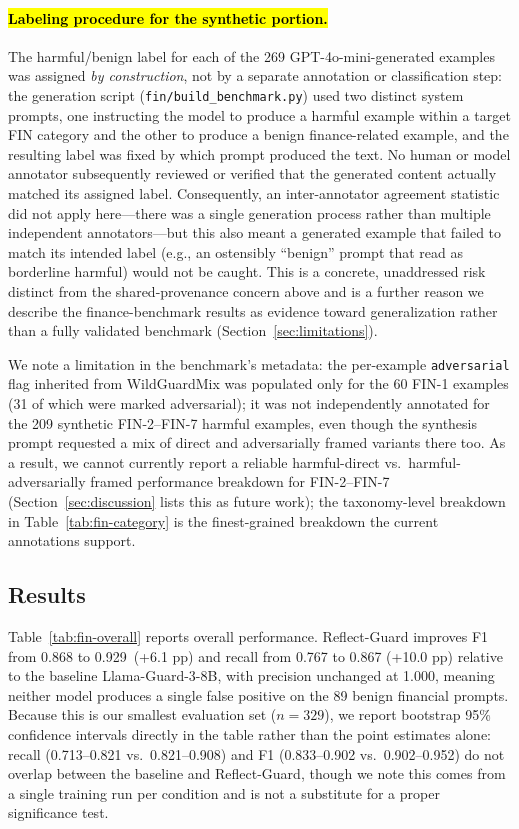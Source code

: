 \documentclass[superintelligence,article,accept,moreauthors]{Definitions/mdpi}
\begin{document}
\paragraph{\hl{Labeling procedure for the synthetic portion.} %
} The harmful/benign label for each of the 269 GPT-4o-mini-generated examples was assigned \emph{by construction}, not by a separate annotation or classification step: the generation script (\texttt{fin/build\_benchmark.py}) used two distinct system prompts, one instructing the model to produce a harmful example within a target FIN category and the other to produce a benign finance-related example, and the resulting label was fixed by which prompt produced the text. No human or model annotator subsequently reviewed or verified that the generated content actually matched its assigned label. Consequently, an inter-annotator agreement statistic did not apply here---there was a single generation process rather than multiple independent annotators---but this also meant a generated example that failed to match its intended label (e.g., an ostensibly ``benign'' prompt that read as borderline harmful) would not be caught. This is a concrete, unaddressed risk distinct from the shared-provenance concern above and is a further reason we describe the finance-benchmark results as evidence toward generalization rather than a fully validated benchmark (Section~\ref{sec:limitations}).

We note a limitation in the benchmark's metadata: the per-example \texttt{adversarial} flag inherited from WildGuardMix was populated only for the 60 FIN-1 examples (31 of which were marked adversarial); it was not independently annotated for the 209 synthetic FIN-2--FIN-7 harmful examples, even though the synthesis prompt requested a mix of direct and adversarially framed variants there too. As a result, we cannot currently report a reliable harmful-direct vs.\ harmful-adversarially framed performance breakdown for FIN-2--FIN-7 (Section~\ref{sec:discussion} lists this as future work); the taxonomy-level breakdown in Table~\ref{tab:fin-category} is the finest-grained breakdown the current annotations support.

\subsection{Results}

Table~\ref{tab:fin-overall} reports overall performance. Reflect-Guard improves F1 from 0.868 to 0.929~(+6.1 pp) and recall from 0.767 to 0.867 (+10.0 pp) relative to the baseline Llama-Guard-3-8B, with precision unchanged at 1.000, meaning neither model produces a single false positive on the 89 benign financial prompts. Because this is our smallest evaluation set ($n=329$), we report bootstrap 95\% confidence intervals directly in the table rather than the point estimates alone: recall (0.713--0.821 vs.\ 0.821--0.908) and F1 (0.833--0.902 vs.\ 0.902--0.952) do not overlap between the baseline and Reflect-Guard, though we note this comes from a single training run per condition and is not a substitute for a proper significance test.
\end{document}

